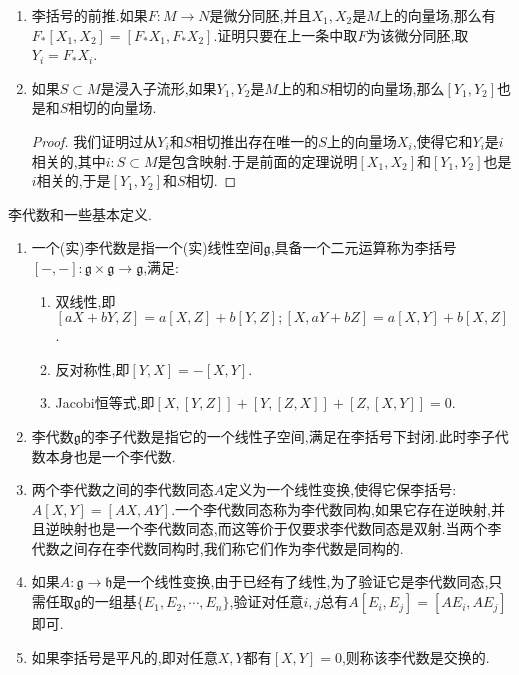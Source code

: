 \begin{enumerate}
\begin{proof}
    	我们证明过$X$和$Y$是$F$相关的等价于讲对$N$上每个光滑函数$f$都有$X(f\circ F)=(Yf)\circ F$.于是任取$N$上的光滑函数$f$,那么有:
    	\begin{align*}
    	[X_1,X_2](f\circ F)&=X_1(X_2(f\circ F))-X_2(X_1(f\circ F))\\&=X_1((Y_2f)\circ F)-X_2((Y_1f)\circ F)\\&=(Y_1Y_2f)\circ F-(Y_2Y_1f)\circ F\\&=([Y_1,Y_2]f)\circ F
    	\end{align*}
    \end{proof}
    \item 李括号的前推.如果$F:M\to N$是微分同胚,并且$X_1,X_2$是$M$上的向量场,那么有$F_*[X_1,X_2]=[F_*X_1,F_*X_2]$.证明只要在上一条中取$F$为该微分同胚,取$Y_i=F_*X_i$.
    \item 如果$S\subset M$是浸入子流形,如果$Y_1,Y_2$是$M$上的和$S$相切的向量场,那么$[Y_1,Y_2]$也是和$S$相切的向量场.
    \begin{proof}
    	
    	我们证明过从$Y_i$和$S$相切推出存在唯一的$S$上的向量场$X_i$,使得它和$Y_i$是$i$相关的,其中$i:S\subset M$是包含映射.于是前面的定理说明$[X_1,X_2]$和$[Y_1,Y_2]$也是$i$相关的,于是$[Y_1,Y_2]$和$S$相切.
    \end{proof}
\end{enumerate}

李代数和一些基本定义.
\begin{enumerate}
	\item 一个(实)李代数是指一个(实)线性空间$\mathfrak{g}$,具备一个二元运算称为李括号$[-,-]:\mathfrak{g}\times\mathfrak{g}\to\mathfrak{g}$,满足:
	\begin{enumerate}
		\item 双线性,即$[aX+bY,Z]=a[X,Z]+b[Y,Z];[X,aY+bZ]=a[X,Y]+b[X,Z]$.
		\item 反对称性,即$[Y,X]=-[X,Y]$.
		\item Jacobi恒等式,即$[X,[Y,Z]]+[Y,[Z,X]]+[Z,[X,Y]]=0$.
	\end{enumerate}
    \item 李代数$\mathfrak{g}$的李子代数是指它的一个线性子空间,满足在李括号下封闭.此时李子代数本身也是一个李代数.
    \item 两个李代数之间的李代数同态$A$定义为一个线性变换,使得它保李括号:$A[X,Y]=[AX,AY]$.一个李代数同态称为李代数同构,如果它存在逆映射,并且逆映射也是一个李代数同态,而这等价于仅要求李代数同态是双射.当两个李代数之间存在李代数同构时,我们称它们作为李代数是同构的.
    \item 如果$A:\mathfrak{g}\to\mathfrak{h}$是一个线性变换,由于已经有了线性,为了验证它是李代数同态,只需任取$\mathfrak{g}$的一组基$\{E_1,E_2,\cdots,E_n\}$,验证对任意$i,j$总有$A[E_i,E_j]=[AE_i,AE_j]$即可.
    \item 如果李括号是平凡的,即对任意$X,Y$都有$[X,Y]=0$,则称该李代数是交换的.
\end{enumerate}


